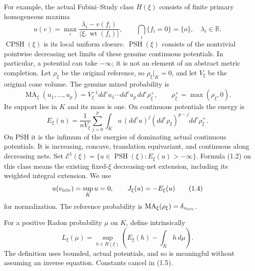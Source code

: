 \documentclass[
  10pt,
]{article}
\begin{document}
For example, the actual Fubini--Study class \(H(\xi)\) consists of
finite primary homogeneous maxima \[
 u(v)=\max_i\frac{\lambda_i-v(f_i)}
                         {\langle\xi,\operatorname{wt}(f_i)\rangle},
 \qquad \bigcap_i\{f_i=0\}=\{o\},\quad \lambda_i\in\mathbb R.
                                                               \tag{1.1}
\] \(\operatorname{CPSH}(\xi)\) is its local uniform closure.
\(\operatorname{PSH}(\xi)\) consists of the nontrivial pointwise
decreasing net limits of these genuine continuous potentials. In
particular, a potential can take \(-\infty\); it is not an element of an
abstract metric completion. Let \(\rho_\xi\) be the original reference,
so \(\rho_\xi|_K=0\), and let \(V_\xi\) be the original cone volume. The
genuine mixed probability is \[
 \operatorname{MA}_\xi(u_1,\ldots,u_p)
 =V_\xi^{-1}dd^cu_1\cdots dd^cu_p\,dd^c\rho_\xi^+,
 \qquad \rho_\xi^+=\max(\rho_\xi,0).                              \tag{1.2}
\] Its support lies in \(K\) and its mass is one. On continuous
potentials the energy is \[
 E_\xi(u)=\frac1{nV_\xi}\sum_{j=0}^p
       \int_Ku\,(dd^cu)^j(dd^c\rho_\xi)^{p-j}dd^c\rho_\xi^+.
                                                               \tag{1.3}
\] On PSH it is the infimum of the energies of dominating actual
continuous potentials. It is increasing, concave, translation
equivariant, and continuous along decreasing nets. Set
\(\mathcal E^1(\xi)=\{u\in\operatorname{PSH}(\xi):E_\xi(u)>-\infty\}\).
Formula (1.2) on this class means the existing fixed-\(\xi\)
decreasing-net extension, including its weighted integral extension. We
use \[
 u(v_{\rm triv})=\sup_Ku=0,\qquad J_\xi(u)=-E_\xi(u)               \tag{1.4}
\] for normalization. The reference probability is
\(\operatorname{MA}_\xi(\rho_\xi)=\delta_{v_{\rm triv}}\).

For a positive Radon probability \(\mu\) on \(K\), define intrinsically
\[
 L_\xi(\mu)=\sup_{h\in H(\xi)}
       \left(E_\xi(h)-\int_Kh\,d\mu\right).                       \tag{1.5}
\] The definition uses bounded, actual potentials, and so is meaningful
without assuming an inverse equation. Constants cancel in (1.5).
\end{document}
